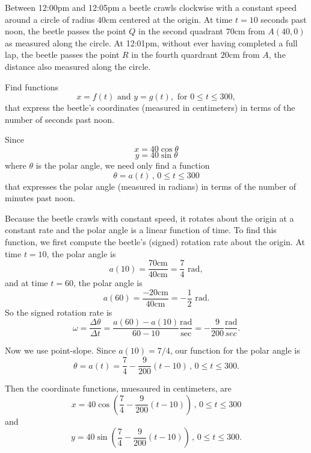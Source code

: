 \documentclass{ximera}
\begin{document}
\begin{example} \label{Qdbyp44:Motion}
Between 12:00pm and 12:05pm a beetle crawls clockwise with a constant speed around a circle of radius $40$cm centered at the origin. At time $t=10$ seconds past noon, the beetle passes the point $Q$ in the second quadrant $70$cm from $A(40,0)$ as measured along the circle. At 12:01pm, without ever having completed a full lap, the beetle passes the point $R$ in the fourth quardrant $20$cm from $A$, the distance also measured along the circle. 

Find functions
\[
   x = f(t) \text{ and } y=g(t) , \text{ for } 0\leq t \leq 300 ,
\]
that express the beetle's coordinates (measured in centimeters) in terms of the number of seconds past noon. 


\begin{explanation}
Since
\[
    x = 40 \cos \theta 
\]
\[
    y = 40\sin\theta
\]
where $\theta$ is the polar angle, we need only find a function
\[
    \theta = a(t) \, , \, 0\leq t \leq 300 
\] 
that expresses the polar angle (measured in radians) in terms of the number of minutes past noon. 


 
\begin{onlineOnly}
    \begin{center}
\end{center}
\end{onlineOnly}


Because the beetle crawls with constant speed, it rotates about the origin at a constant rate and the polar angle is a linear function of time. To find this function, we first compute the beetle's (signed) rotation rate about the origin. At time $t=10$, the polar angle is 
\[
   a(10) = \frac{70 \text{cm}}{40 \text{cm}} = \frac{7}{4}\text { rad} ,
\]
and at time $t=60$, the polar angle is
\[
   a(60) = \frac{-20 \text{cm}}{40 \text{cm}} = - \frac{1}{2}\text { rad}. 
\]
So the signed rotation rate is
\[
   \omega = \frac{\Delta \theta}{\Delta t} = \frac{a(60) - a(10)}{60 - 10 } \frac{\text{rad}}{\text{sec}} = -\frac{9}{200} \frac{\text{rad}}{sec} .
\]

Now we use point-slope. Since $a(10)=7/4$, our function for the polar angle is
\[
    \theta = a(t) = \frac{7}{4} - \frac{9}{200}\left(  t  - 10 \right) \, , \, 0\leq t \leq 300.
\]

Then the coordinate functions, muesaured in centimeters, are
\[
      x = 40 \cos \left(   \frac{7}{4} - \frac{9}{200}\left(  t  - 10 \right)  \right) \, , \, 0\leq t \leq 300
\] 
and
\[
     y =  40 \sin \left(   \frac{7}{4} - \frac{9}{200}\left(  t  - 10 \right)  \right) \, , \, 0\leq t \leq 300 .
\] 

\end{explanation}
\end{example}
\end{document}
